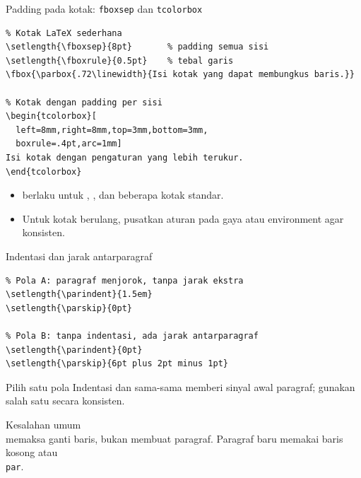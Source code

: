 \documentclass[aspectratio=169,11pt]{beamer}
\newcommand{\dimensi}[1]{\texttt{\detokenize{#1}}}
\begin{document}
\begin{frame}[fragile]{Padding pada kotak: \texttt{fboxsep} dan \texttt{tcolorbox}}
\begin{lstlisting}
% Kotak LaTeX sederhana
\setlength{\fboxsep}{8pt}       % padding semua sisi
\setlength{\fboxrule}{0.5pt}    % tebal garis
\fbox{\parbox{.72\linewidth}{Isi kotak yang dapat membungkus baris.}}

% Kotak dengan padding per sisi
\begin{tcolorbox}[
  left=8mm,right=8mm,top=3mm,bottom=3mm,
  boxrule=.4pt,arc=1mm]
Isi kotak dengan pengaturan yang lebih terukur.
\end{tcolorbox}
\end{lstlisting}
\begin{itemize}
  \item \dimensi{\fboxsep} berlaku untuk \dimensi{\fbox}, \dimensi{\framebox}, dan beberapa kotak standar.
  \item Untuk kotak berulang, pusatkan aturan pada gaya atau environment agar konsisten.
\end{itemize}
\end{frame}

\begin{frame}[fragile]{Indentasi dan jarak antarparagraf}
\footnotesize
\begin{lstlisting}
% Pola A: paragraf menjorok, tanpa jarak ekstra
\setlength{\parindent}{1.5em}
\setlength{\parskip}{0pt}

% Pola B: tanpa indentasi, ada jarak antarparagraf
\setlength{\parindent}{0pt}
\setlength{\parskip}{6pt plus 2pt minus 1pt}
\end{lstlisting}
\begin{block}{Pilih satu pola}
  Indentasi dan \dimensi{\parskip} sama-sama memberi sinyal awal paragraf; gunakan salah satu secara konsisten.
\end{block}
\begin{alertblock}{Kesalahan umum}
  \texttt{\\} memaksa ganti baris, bukan membuat paragraf. Paragraf baru memakai baris kosong atau \texttt{\\par}.
\end{alertblock}
\end{frame}
\end{document}
